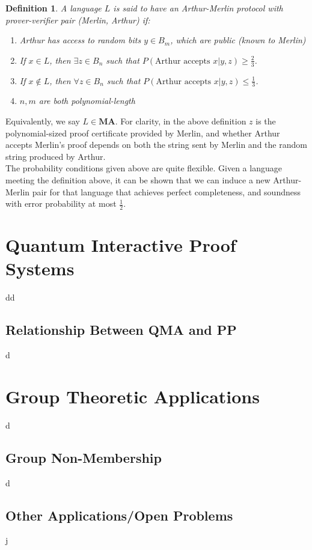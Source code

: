 \documentclass[12pt]{article}
\newtheorem*{defn}{Definition}
\begin{document}
	\begin{defn}
		A language $L$ is said to have an Arthur-Merlin protocol with prover-verifier pair (Merlin, Arthur) if:
		\begin{enumerate}
			\item Arthur has access to random bits $y\in B_m$, which are public (known to Merlin)
			\item If $x\in L$, then $\exists z\in B_n$ such that $P(\text{Arthur accepts }x|y,z)\geq \frac{2}{3}$.
			\item If $x\notin L$, then $\forall z\in B_n$ such that $P(\text{Arthur accepts }x|y,z)\leq\frac{1}{3}$. 
			\item $n,m$ are both polynomial-length
		\end{enumerate}
	
	
	\end{defn}
	Equivalently, we say $L\in \textbf{MA}$. For clarity, in the above definition $z$ is the polynomial-sized proof certificate provided by Merlin, and whether Arthur accepts Merlin's proof depends on both the string sent by Merlin and the random string produced by Arthur.\\
	
	The probability conditions given above are quite flexible. Given a language meeting the definition above, it can be shown that we can induce a new Arthur-Merlin pair for that language that achieves perfect completeness, and soundness with error probability at most $\frac{1}{2}$.
    \section{Quantum Interactive Proof Systems}
    dd
    \subsection{Relationship Between QMA and PP}d
    
    \section{Group Theoretic Applications}
    d
    \subsection{Group Non-Membership}d
    \subsection{Other Applications/Open Problems}j
	
\end{document}
